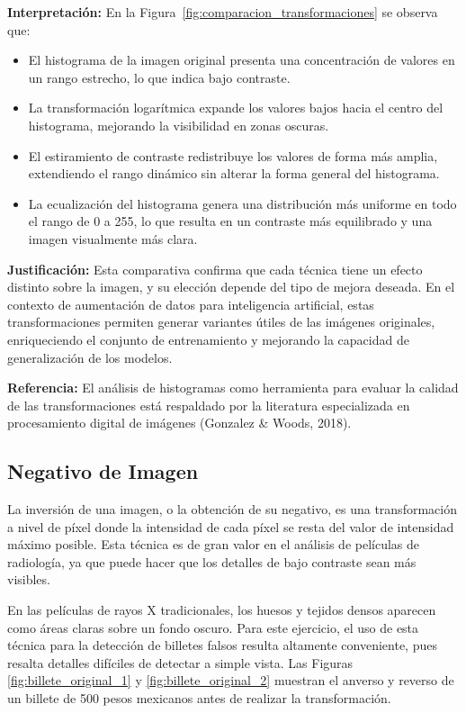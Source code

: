 \documentclass[12pt,letterpaper]{article}
\begin{document}
\textbf{Interpretación:} En la Figura~\ref{fig:comparacion_transformaciones} se observa que:

\begin{itemize}
    \item El histograma de la imagen original presenta una concentración de valores en un rango estrecho, lo que indica bajo contraste.
    \item La transformación logarítmica expande los valores bajos hacia el centro del histograma, mejorando la visibilidad en zonas oscuras.
    \item El estiramiento de contraste redistribuye los valores de forma más amplia, extendiendo el rango dinámico sin alterar la forma general del histograma.
    \item La ecualización del histograma genera una distribución más uniforme en todo el rango de 0 a 255, lo que resulta en un contraste más equilibrado y una imagen visualmente más clara.
\end{itemize}

\textbf{Justificación:} Esta comparativa confirma que cada técnica tiene un efecto distinto sobre la imagen, y su elección depende del tipo de mejora deseada. En el contexto de aumentación de datos para inteligencia artificial, estas transformaciones permiten generar variantes útiles de las imágenes originales, enriqueciendo el conjunto de entrenamiento y mejorando la capacidad de generalización de los modelos.

\textbf{Referencia:} El análisis de histogramas como herramienta para evaluar la calidad de las transformaciones está respaldado por la literatura especializada en procesamiento digital de imágenes (Gonzalez & Woods, 2018).

\subsection{Negativo de Imagen}

La inversión de una imagen, o la obtención de su negativo, es una transformación a nivel de píxel donde la intensidad de cada píxel se resta del valor de intensidad máximo posible. Esta técnica es de gran valor en el análisis de películas de radiología, ya que puede hacer que los detalles de bajo contraste sean más visibles.

En las películas de rayos X tradicionales, los huesos y tejidos densos aparecen como áreas claras sobre un fondo oscuro. Para este ejercicio, el uso de esta técnica para la detección de billetes falsos resulta altamente conveniente, pues resalta detalles difíciles de detectar a simple vista. Las Figuras \ref{fig:billete_original_1} y \ref{fig:billete_original_2} muestran el anverso y reverso de un billete de 500 pesos mexicanos antes de realizar la transformación.
\end{document}
